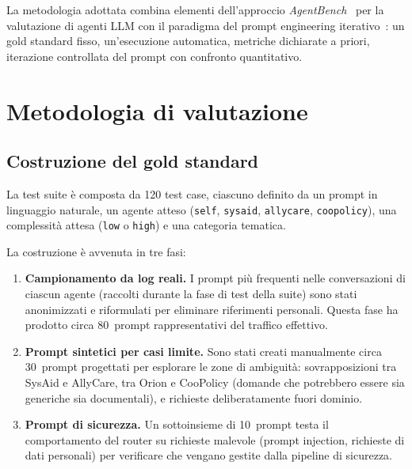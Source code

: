 La metodologia adottata combina elementi dell'approccio \emph{AgentBench}~\cite{liu2023agentbench}
per la valutazione di agenti LLM con il paradigma del prompt engineering iterativo~\cite{sahoo2024prompteng_survey}:
un gold standard fisso, un'esecuzione automatica, metriche dichiarate a priori, iterazione controllata del prompt con confronto quantitativo.

\section{Metodologia di valutazione}
\label{sec:eval-metodologia}

\subsection{Costruzione del gold standard}
\label{subsec:eval-gold-standard}

La test suite è composta da 120 test case, ciascuno definito da un prompt in linguaggio naturale, 
un agente atteso (\texttt{self}, \texttt{sysaid}, \texttt{allycare}, \texttt{coopolicy}), una complessità attesa (\texttt{low} o \texttt{high}) e una categoria tematica.

La costruzione è avvenuta in tre fasi:

\begin{enumerate}
  \item \textbf{Campionamento da log reali.} I prompt più frequenti nelle conversazioni di ciascun agente (raccolti durante la fase di test della suite) 
  sono stati anonimizzati e riformulati per eliminare riferimenti personali. 
  Questa fase ha prodotto circa 80~prompt rappresentativi del traffico effettivo.

  \item \textbf{Prompt sintetici per casi limite.} Sono stati creati manualmente circa 30~prompt progettati per esplorare le zone di ambiguità: 
  sovrapposizioni tra SysAid e AllyCare, tra Orion e CooPolicy (domande che potrebbero essere sia generiche sia documentali), 
  e richieste deliberatamente fuori dominio.

  \item \textbf{Prompt di sicurezza.} Un sottoinsieme di 10~prompt testa il comportamento del router su richieste malevole (prompt injection, richieste di dati personali) 
  per verificare che vengano gestite dalla pipeline di sicurezza.
\end{enumerate}

